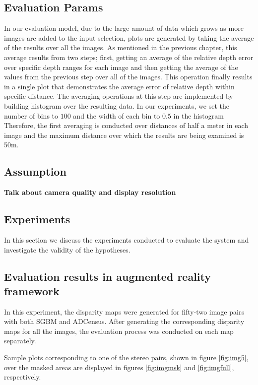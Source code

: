 \subsection{Evaluation Params}
In our evaluation model, due to the large amount of data which grows as more images are added to the input selection, 
plots are generated by taking the average of the results over all the images. As mentioned in the previous chapter, this average results from two steps; 
first, getting an average of the relative depth error over specific
depth ranges for each image and then getting the average of the values from the previous step over all of the images. This operation finally results in a single plot
that demonstrates the average error of relative depth within specific distance.
The averaging operations at this step are implemented by building histogram over the resulting data. 
In our experiments, we set the number of bins to $100$ and the width of each bin to $0.5$ in the histogram 
Therefore, the first averaging is conducted over distances of half a meter in each image and the maximum distance over which the results are 
being examined is 50m.

\subsection{Assumption}
\textbf{Talk about camera quality and display resolution}

\subsection{Experiments}
In this section we discuss the experiments conducted to evaluate the system and investigate the validity of the hypotheses.

\subsection{Evaluation results in augmented reality framework}

In this experiment, the disparity maps 
were generated for fifty-two image pairs with both SGBM and ADCensus. 
After generating the corresponding disparity maps for all the images, 
the evaluation process was conducted on each map separately.

Sample plots corresponding to one of the stereo pairs, shown in figure \ref{fig:img5},
over the masked areas are displayed in figures \ref{fig:imgmsk} and \ref{fig:imgfull}, respectively.

